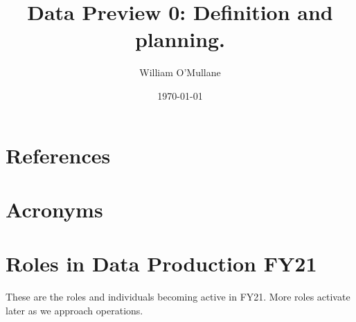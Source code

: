 \documentclass[OPS,authoryear]{lsstdoc}
\title{Data Preview 0: Definition and planning.}
\author{%
William O'Mullane
}
\date{\today}
\begin{document}

\mkshorttitle





\appendix

\section{References} \label{sec:bib}
\renewcommand{\refname}{}


\section{Acronyms} \label{sec:acronyms}


\section {Roles in Data Production FY21}
These are the roles and individuals becoming active in FY21.
More roles activate later as we approach operations.

\end{document}
